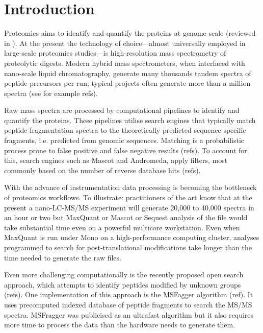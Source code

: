 \documentclass[sn-standardnature]{sn-jnl}%
\theoremstyle{thmstyleone}%
\theoremstyle{thmstyletwo}%
\theoremstyle{thmstylethree}%
\begin{document}
\section{Introduction}\label{sec1}
Proteomics aims to identify and quantify the proteins at genome scale (reviewed in \cite{bib1}). At the present the technology of choice—almost universally employed  in large-scale proteomics studies—is high-resolution mass spectrometry of proteolytic digests. Modern hybrid mass spectrometers, when interfaced with nano-scale liquid chromatography, generate many thousands tandem spectra of peptide precursors per run; typical projects often generate more than a million spectra (see for example refs). 

Raw mass spectra are processed by computational pipelines to identify and quantify the proteins. These pipelines utilise search engines that typically match peptide fragmentation spectra to the theoretically predicted sequence specific fragments, i.e. predicted from genomic sequences. Matching is a probabilistic process prone to false positive and false negative results (refs). To account for this, search engines such as Mascot and Andromeda, apply filters, most commonly based on the number of reverse database hits (refs). 

With the advance of instrumentation data processing is becoming the bottleneck of proteomics workflows. To illustrate: practitioners of the art know that at the present a nano-LC-MS/MS experiment will generate 20,000 to 40,000 spectra in an hour or two but MaxQuant  or Mascot or Sequest analysis of the file would take substantial time even on a powerful multicore workstation. Even when MaxQuant is run under Mono on a high-performance computing cluster, analyses programmed to search for post-translational modifications take longer than the time needed to generate the raw files.

Even more challenging computationally is the recently proposed open search approach, which attempts to identify peptides modified by unknown groups (refs). One implementation of this approach is the MSFagger algorithm (ref). It uses precomputed indexed database of peptide fragments to search the MS/MS spectra. MSFragger was publicised as an ultrafast algorithm but it also requires more time to process the data than the hardware needs to generate them. 
\end{document}
